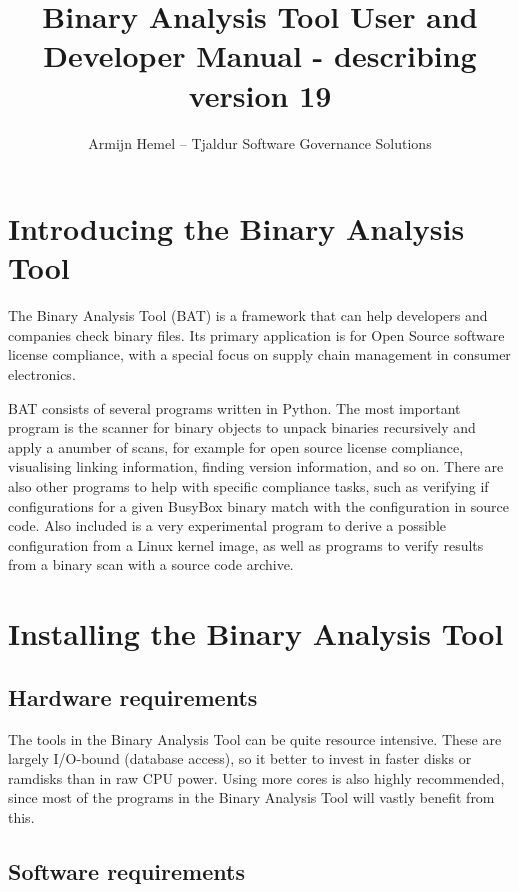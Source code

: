 \documentclass[10pt]{article}
\author{Armijn Hemel -- Tjaldur Software Governance Solutions}
\title{Binary Analysis Tool User and Developer Manual - describing version 19}
\begin{document}
\maketitle
\thispagestyle{empty}

\tableofcontents

\section{Introducing the Binary Analysis Tool}

The Binary Analysis Tool (BAT) is a framework that can help developers and
companies check binary files. Its primary application is for Open Source
software license compliance, with a special focus on supply chain management
in consumer electronics.

BAT consists of several programs written in Python. The most important program
is the scanner for binary objects to unpack binaries recursively and apply a
anumber of scans, for example for open source license compliance, visualising
linking information, finding version information, and so on.  There are also
other programs to help with specific compliance tasks, such as verifying if
configurations for a given BusyBox binary match with the configuration in
source code. Also included is a very experimental program to derive a possible
configuration from a Linux kernel image, as well as programs to verify results
from a binary scan with a source code archive.

\section{Installing the Binary Analysis Tool}

\subsection{Hardware requirements}

The tools in the Binary Analysis Tool can be quite resource intensive. These
are largely I/O-bound (database access), so it better to invest in faster disks
or ramdisks than in raw CPU power. Using more cores is also highly recommended,
since most of the programs in the Binary Analysis Tool will vastly benefit from
this.

\subsection{Software requirements}
\end{document}
